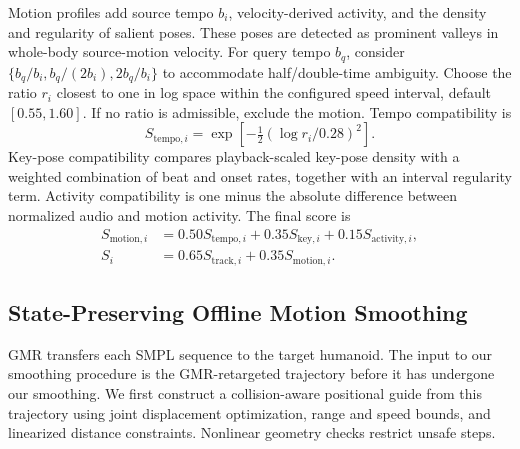 \documentclass[conference]{IEEEtran}
\begin{document}
Motion profiles add source tempo $b_i$, velocity-derived activity, and the
density and regularity of salient poses. These poses are detected as prominent
valleys in whole-body source-motion velocity. For query tempo $b_q$, consider
$\{b_q/b_i,b_q/(2b_i),2b_q/b_i\}$ to accommodate half/double-time ambiguity.
Choose the ratio $r_i$ closest to one in log space within the configured speed
interval, default $[0.55,1.60]$. If no ratio is admissible, exclude the motion.
Tempo compatibility is
\begin{equation}
S_{\mathrm{tempo},i}=\exp\!\left[-\tfrac12(\log r_i/0.28)^2\right].
\end{equation}
Key-pose compatibility compares playback-scaled key-pose density with a
weighted combination of beat and onset rates, together with an interval
regularity term. Activity compatibility is one minus the absolute difference
between normalized audio and motion activity. The final score is
\begin{align}
S_{\mathrm{motion},i}&=0.50S_{\mathrm{tempo},i}
+0.35S_{\mathrm{key},i}+0.15S_{\mathrm{activity},i},\\
S_i&=0.65S_{\mathrm{track},i}+0.35S_{\mathrm{motion},i}.
\end{align}


\subsection{State-Preserving Offline Motion Smoothing}
\label{sec:smoothing}
GMR transfers each SMPL sequence to the target humanoid. The input to our
smoothing procedure is the GMR-retargeted trajectory before it has undergone
our smoothing. We first construct a collision-aware positional guide from
this trajectory using joint displacement optimization, range and speed
bounds, and linearized distance constraints. Nonlinear geometry checks
restrict unsafe steps.
\end{document}

